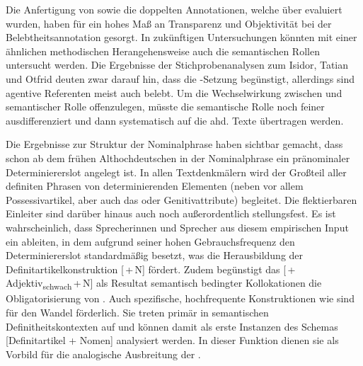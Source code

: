 Die Anfertigung von  \parencite[dokumentiert in][]{HZKYL4_2020} sowie die doppelten  Annotationen, welche über  evaluiert wurden, haben für ein hohes Maß an Transparenz und Objektivität  bei der   Belebtheitsannotation  gesorgt. In zukünftigen Untersuchungen könnten mit einer ähnlichen methodischen Herangehensweise auch die semantischen Rollen  untersucht werden. Die Ergebnisse der Stichprobenanalysen zum Isidor, Tatian und Otfrid deuten zwar darauf hin, dass  die -Setzung begünstigt, allerdings sind agentive Referenten meist auch belebt. Um die Wechselwirkung zwischen  und semantischer Rolle  offenzulegen, müsste die semantische Rolle noch feiner ausdifferenziert und dann systematisch auf die ahd. Texte übertragen werden. 

Die Ergebnisse zur Struktur  der  Nominalphrase haben sichtbar gemacht, dass schon ab dem frühen Althochdeutschen in der Nominalphrase ein pränominaler  Determiniererslot  angelegt ist. In allen Textdenkmälern wird der Großteil aller definiten Phrasen von determinierenden Elementen (neben  vor allem  Possessivartikel, aber auch das   oder  Genitivattribute) begleitet. Die flektierbaren  Einleiter sind darüber hinaus auch noch außerordentlich stellungsfest. Es ist wahrscheinlich, dass Sprecherinnen und Sprecher aus diesem empirischen Input ein  ableiten, in dem  aufgrund seiner hohen Gebrauchsfrequenz den Determiniererslot standardmäßig besetzt, was die Herausbildung der Definitartikelkonstruktion   [\,+\,N] fördert. Zudem begünstigt das   [\,+\,Adjektiv\textsubscript{schwach}\,+\,N] als Resultat semantisch bedingter Kollokationen die Obligatorisierung von . Auch spezifische, hochfrequente Konstruktionen  wie  sind für den Wandel förderlich. Sie treten primär in semantischen  Definitheitskontexten  auf und können damit als erste Instanzen des Schemas  [Definitartikel + Nomen] analysiert werden. In dieser Funktion dienen sie als Vorbild für die analogische  Ausbreitung der . 







